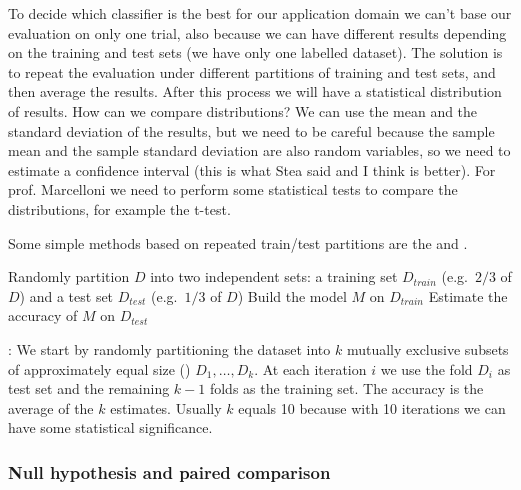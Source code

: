 To decide which classifier is the best for our application domain we can't base our evaluation on only one trial, also because we can have different results depending on the training and test sets (we have only one labelled dataset). The solution is to repeat the evaluation under different partitions of training and test sets, and then average the results. After this process we will have a statistical distribution of results. How can we compare distributions? We can use the mean and the standard deviation of the results, but we need to be careful because the sample mean and the sample standard deviation are also random variables, so we need to estimate a confidence interval (this is what Stea said and I think is better). For prof. Marcelloni we need to perform some statistical tests to compare the distributions, for example the t-test.

Some simple methods based on repeated train/test partitions are the  and .

\begin{algorithm}[H]
\caption{Holdout method}
Randomly partition $D$ into two independent sets: a training set $D_{train}$ (e.g.\ $2/3$ of $D$) and a test set $D_{test}$ (e.g.\ $1/3$ of $D$)\;
Build the model $M$ on $D_{train}$\;
Estimate the accuracy of $M$ on $D_{test}$\;
\end{algorithm}

\begin{algorithm}[H]
\caption{Random subsampling}
\;
\end{algorithm}

:
We start by randomly partitioning the dataset into $k$ mutually exclusive subsets of approximately equal size () $D_1, \dots, D_k$. At each iteration $i$ we use the fold $D_i$ as test set and the remaining $k-1$ folds as the training set. The accuracy is the average of the $k$ estimates. Usually $k$ equals 10 because with 10 iterations we can have some statistical significance.

\subsubsection{Null hypothesis and paired comparison}

